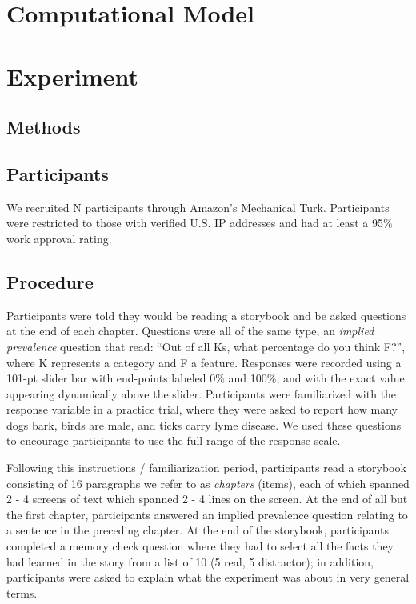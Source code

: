 \documentclass[10pt,letterpaper]{article}
\begin{document}
\section{Computational Model}


\section{Experiment}

\subsection{Methods}

\subsection{Participants}
We recruited N participants through Amazon's Mechanical Turk.
Participants were restricted to those with verified U.S. IP addresses and had at least a 95\% work approval rating. 

\subsection{Procedure}
Participants were told they would be reading a storybook and be asked questions at the end of each chapter. 
Questions were all of the same type, an \emph{implied prevalence} question \cite{Gelman2002, Cimpian2010} that read: ``Out of all Ks, what percentage do you think F?'', where K represents a category and F a feature. 
Responses were recorded using a 101-pt slider bar with end-points labeled 0\% and 100\%, and with the exact value appearing dynamically above the slider. 
Participants were familiarized with the response variable in a practice trial, where they were asked to report how many dogs bark, birds are male, and ticks carry lyme disease. 
We used these questions to encourage participants to use the full range of the response scale. 

Following this instructions / familiarization period, participants read a storybook consisting of 16 paragraphs we refer to as \emph{chapters} (items), each of which spanned 2 - 4 screens of text which spanned 2 - 4 lines on the screen. 
At the end of all but the first chapter, participants answered an implied prevalence question relating to a sentence in the preceding chapter. 
At the end of the storybook, participants completed a memory check question where they had to select all the facts they had learned in the story from a list of 10 (5 real, 5 distractor); in addition, participants were asked to explain what the experiment was about in very general terms.
\end{document}
